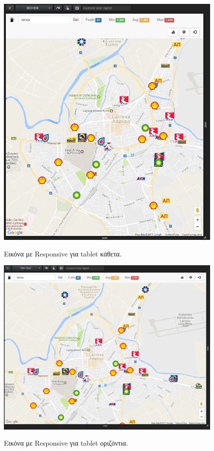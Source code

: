 \begin{figure}[H]
  \caption{Εικόνα με Responsive για tablet κάθετα.}
  \centering
    \includegraphics[width=1\textwidth]{img/responsive-tablet-1.png}
    \label{fig:responsive2}
\end{figure}

\begin{figure}[H]
  \caption{Εικόνα με Responsive για tablet οριζόντια.}
  \centering
    \includegraphics[width=1\textwidth]{img/responsive-tablet-2.png}
    \label{fig:responsive2}
\end{figure}

